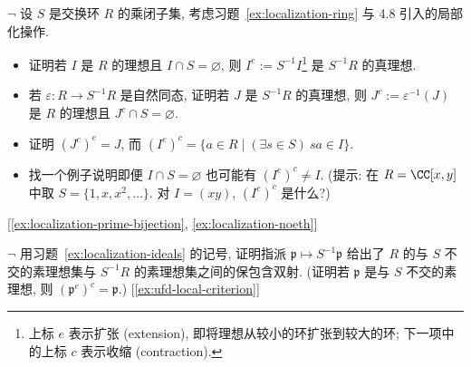 \begin{prob}
\label{ex:localization-ideals}
$\neg$ 设 $S$ 是交换环 $R$ 的乘闭子集, 考虑习题~\ref{ex:localization-ring} 与 4.8 引入的局部化操作.
\begin{itemize}
\item 证明若 $I$ 是 $R$ 的理想且 $I\cap S=\varnothing$, 则 $I^e:=S^{-1}I$\footnote{上标 $e$ 表示扩张 (extension), 即将理想从较小的环扩张到较大的环; 下一项中的上标 $c$ 表示收缩 (contraction).} 是 $S^{-1}R$ 的真理想.
\item 若 $\varepsilon:R\to S^{-1}R$ 是自然同态, 证明若 $J$ 是 $S^{-1}R$ 的真理想, 则 $J^c:=\varepsilon^{-1}(J)$ 是 $R$ 的理想且 $J^c\cap S=\varnothing$.
\item 证明 $(J^c)^e=J$, 而 $(I^e)^c=\{a\in R\mid (\exists s\in S)\ sa\in I\}$.
\item 找一个例子说明即便 $I\cap S=\varnothing$ 也可能有 $(I^e)^c\neq I$. (提示: 在 $R=\CC[x,y]$ 中取 $S=\{1,x,x^2,\dots\}$. 对 $I=(xy)$, $(I^e)^c$ 是什么?)
\end{itemize}
[\ref{ex:localization-prime-bijection}, \ref{ex:localization-noeth}]
\end{prob}

\begin{prob}
\label{ex:localization-prime-bijection}
$\neg$ 用习题~\ref{ex:localization-ideals} 的记号, 证明指派 $\mathfrak{p}\mapsto S^{-1}\mathfrak{p}$ 给出了 $R$ 的与 $S$ 不交的素理想集与 $S^{-1}R$ 的素理想集之间的保包含双射. (证明若 $\mathfrak{p}$ 是与 $S$ 不交的素理想, 则 $(\mathfrak{p}^e)^c=\mathfrak{p}$.) [\ref{ex:ufd-local-criterion}]
\end{prob}

